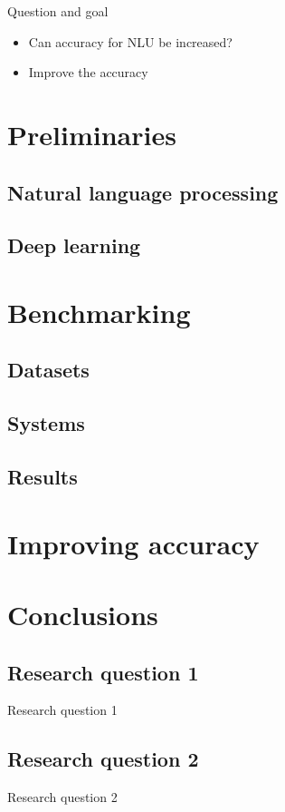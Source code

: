 \documentclass[pdf]{beamer}
\begin{document}
\begin{frame}{Question and goal}
  \begin{itemize}
  \item Can accuracy for NLU be increased?
  \item Improve the accuracy
  \end{itemize}
\end{frame}


\section{Preliminaries}
\subsection{Natural language processing}

\subsection{Deep learning}

\section{Benchmarking}
\subsection{Datasets}
\subsection{Systems}
\subsection{Results}

\section{Improving accuracy}

\section{Conclusions}
\subsection{Research question 1}
\begin{frame}{Research question 1}
\end{frame}

\subsection{Research question 2}
\begin{frame}{Research question 2}

\end{frame}
\end{document}
